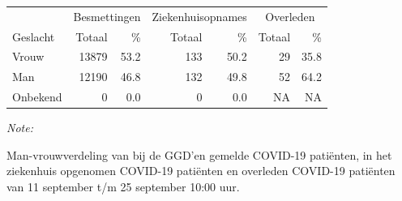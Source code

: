 \documentclass[
  english,
  man,floatsintext]{apa6}
\begin{document}
\begin{table}
\centering\begingroup\fontsize{11}{13}\selectfont

\begin{threeparttable}
\begin{tabular}{lrrrrrr}
\toprule
\multicolumn{1}{c}{ } & \multicolumn{2}{c}{Besmettingen} & \multicolumn{2}{c}{Ziekenhuisopnames} & \multicolumn{2}{c}{Overleden} \\
\cmidrule(l{3pt}r{3pt}){2-3} \cmidrule(l{3pt}r{3pt}){4-5} \cmidrule(l{3pt}r{3pt}){6-7}
Geslacht & Totaal & \% & Totaal & \% & Totaal & \%\\
\midrule
Vrouw & 13879 & 53.2 & 133 & 50.2 & 29 & 35.8\\
Man & 12190 & 46.8 & 132 & 49.8 & 52 & 64.2\\
Onbekend & 0 & 0.0 & 0 & 0.0 & NA & NA\\
\bottomrule
\end{tabular}
\begin{tablenotes}
\item \textit{Note: } 
\item Man-vrouwverdeling van bij de GGD’en gemelde COVID-19 patiënten, in het ziekenhuis opgenomen COVID-19 patiënten en overleden COVID-19 patiënten van 11 september t/m 25 september 10:00 uur.
\end{tablenotes}
\end{threeparttable}
\endgroup{}
\end{table}
\newpage
\end{document}
